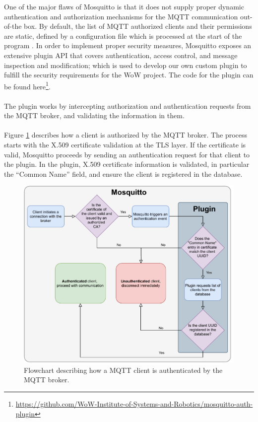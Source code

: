 One of the major flaws of Mosquitto is that it does not supply proper dynamic authentication and authorization mechanisms for the \acs{MQTT} communication out-of-the box. By default, the list of \acs{MQTT} authorized clients and their permissions are static, defined by a configuration file which is processed at the start of the program \cite{mosquitto}. In order to implement proper security measures, Mosquitto exposes an extensive plugin \acs{API} \cite{mosquitto} that covers authentication, access control, and message inspection and modification; which is used to develop our own custom plugin to fulfill the security requirements for the \acs{WoW} project. The code for the plugin can be found here\footnote{\url{https://github.com/WoW-Institute-of-Systems-and-Robotics/mosquitto-auth-plugin}}.

\paragraph{} The plugin works by intercepting authorization and authentication requests from the \acs{MQTT} broker, and validating the information in them. 

\paragraph{} Figure \ref{fig:mqtt-plugin-authnflow} describes how a client is authorized by the \acs{MQTT} broker. The process starts with the X.509 certificate validation at the \acs{TLS} layer. If the certificate is valid, Mosquitto proceeds by sending an authentication request for that client to the plugin. In the plugin, X.509 certificate information is validated, in particular the ``Common Name'' field, and ensure the client is registered in the database.

\begin{figure}[H]
    \centering
    \includegraphics[width=0.7\linewidth]{images/mqtt authentication.pdf}
    \caption{Flowchart describing how a \acs{MQTT} client is authenticated by the \acs{MQTT} broker.}
    \label{fig:mqtt-plugin-authnflow}
\end{figure}

